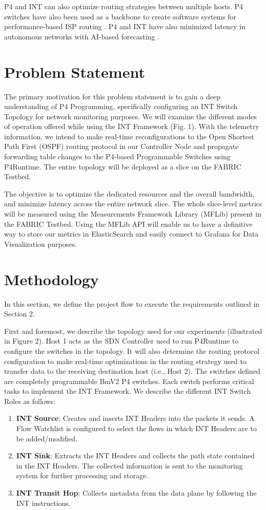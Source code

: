 \documentclass[conference]{IEEEtran}
\begin{document}
P4 and INT can also optimize routing strategies between multiple hosts. P4 switches have also been used as a backbone to create software systems for performance-based ISP routing \cite{b12}. P4 and INT have also minimized latency in autonomous networks with AI-based forecasting \cite{b13}.

\section{Problem Statement}
The primary motivation for this problem statement is to gain a deep understanding of P4 Programming, specifically configuring an INT Switch Topology for network monitoring purposes. We will examine the different modes of operation offered while using the INT Framework (Fig. 1). With the telemetry information, we intend to make real-time reconfigurations to the Open Shortest Path First (OSPF) routing protocol in our Controller Node and propagate forwarding table changes to the P4-based Programmable Switches using P4Runtime. The entire topology will be deployed as a slice on the FABRIC Testbed.

The objective is to optimize the dedicated resources and the overall bandwidth, and minimize latency across the entire network slice. The whole slice-level metrics will be measured using the Measurements Framework Library (MFLib) present in the FABRIC Testbed. Using the MFLib API will enable us to have a definitive way to store our metrics in ElasticSearch and easily connect to Grafana for Data Visualization purposes.

\section{Methodology}
In this section, we define the project flow to execute the requirements outlined in Section 2. 

First and foremost, we describe the topology used for our experiments (illustrated in Figure 2). Host 1 acts as the SDN Controller used to run P4Runtime to configure the switches in the topology. It will also determine the routing protocol configuration to make real-time optimizations in the routing strategy used to transfer data to the receiving destination host (i.e., Host 2). The switches defined are completely programmable BmV2 P4 switches. Each switch performs critical tasks to implement the INT Framework. We describe the different INT Switch Roles as follows:
\begin{enumerate}
\item \textbf{INT Source}: Creates and inserts INT Headers into the packets it sends. A Flow Watchlist is configured to select the flows in which INT Headers are to be added/modified.
\item \textbf{INT Sink}: Extracts the INT Headers and collects the path state contained in the INT Headers. The collected information is sent to the monitoring system for further processing and storage.
\item \textbf{INT Transit Hop}: Collects metadata from the data plane by following the INT instructions. 
\end{enumerate}
\end{document}
